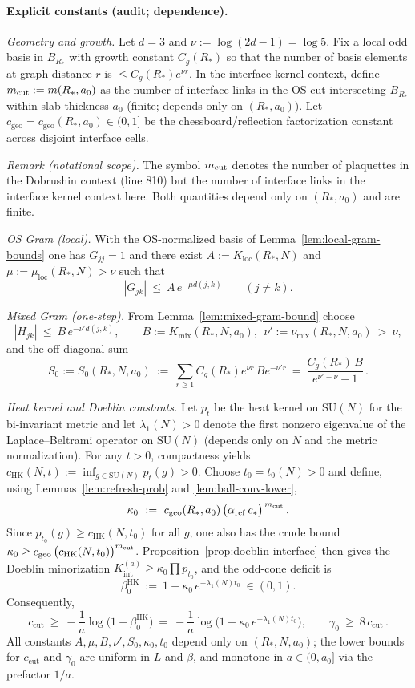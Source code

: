 \documentclass[11pt]{amsart}
\theoremstyle{plain}
\theoremstyle{definition}
\theoremstyle{remark}
\begin{document}
\paragraph{Explicit constants (audit; dependence).}
\emph{Geometry and growth.} Let $d=3$ and $\nu:=\log(2d-1)=\log 5$. Fix a local odd basis in $B_{R_*}$ with growth constant $C_g(R_*)$ so that the number of basis elements at graph distance $r$ is $\le C_g(R_*) e^{\nu r}$. In the interface kernel context, define $m_{\rm cut}:=m(R_*,a_0)$ as the number of interface links in the OS cut intersecting $B_{R_*}$ within slab thickness $a_0$ (finite; depends only on $(R_*,a_0)$). Let $c_{\mathrm{geo}}=c_{\mathrm{geo}}(R_*,a_0)\in(0,1]$ be the chessboard/reflection factorization constant across disjoint interface cells.

\emph{Remark (notational scope).} The symbol $m_{\rm cut}$ denotes the number of plaquettes in the Dobrushin context (line 810) but the number of interface links in the interface kernel context here. Both quantities depend only on $(R_*,a_0)$ and are finite.

\emph{OS Gram (local).} With the OS-normalized basis of Lemma~\ref{lem:local-gram-bounds} one has $G_{jj}=1$ and there exist $A:=K_{\mathrm{loc}}(R_*,N)$ and $\mu:=\mu_{\mathrm{loc}}(R_*,N)>\nu$ such that
\[
  |G_{jk}|\ \le\ A\,e^{-\mu d(j,k)}\qquad (j\ne k).
\]

\emph{Mixed Gram (one-step).} From Lemma~\ref{lem:mixed-gram-bound} choose
\[
  |H_{jk}|\ \le\ B\,e^{-\nu' d(j,k)},\qquad B:=K_{\mathrm{mix}}(R_*,N,a_0),\ \ \nu':=\nu_{\mathrm{mix}}(R_*,N,a_0)\ >\ \nu,
\]
and the off-diagonal sum
\[
  S_0:=S_0(R_*,N,a_0)\ :=\ \sum_{r\ge 1} C_g(R_*) e^{\nu r}\, B e^{-\nu' r}
   \ =\ \frac{C_g(R_*)\,B}{e^{\nu'-\nu}-1}\,.
\]

\emph{Heat kernel and Doeblin constants.} Let $p_t$ be the heat kernel on $\mathrm{SU}(N)$ for the bi-invariant metric and let $\lambda_1(N)>0$ denote the first nonzero eigenvalue of the Laplace--Beltrami operator on $\mathrm{SU}(N)$ (depends only on $N$ and the metric normalization). For any $t>0$, compactness yields $c_{\mathrm{HK}}(N,t):=\inf_{g\in \mathrm{SU}(N)} p_t(g)>0$. Choose $t_0=t_0(N)>0$ and define, using Lemmas~\ref{lem:refresh-prob} and \ref{lem:ball-conv-lower},
\[
  \kappa_0\ :=\ c_{\mathrm{geo}}(R_*,a_0)\,\bigl(\alpha_{\mathrm{ref}}\,c_*\bigr)^{\,m_{\rm cut}}\,.
\]
Since $p_{t_0}(g)\ge c_{\mathrm{HK}}(N,t_0)$ for all $g$, one also has the crude bound $\kappa_0\ge c_{\mathrm{geo}}\,\bigl(c_{\mathrm{HK}}(N,t_0)\bigr)^{m_{\rm cut}}$. Proposition~\ref{prop:doeblin-interface} then gives the Doeblin minorization $K_{\mathrm{int}}^{(a)}\ge \kappa_0 \prod p_{t_0}$, and the odd-cone deficit is
\[
  \beta_0^{\mathrm{HK}}\ :=\ 1-\kappa_0\,e^{-\lambda_1(N) t_0}\ \in (0,1).
\]
Consequently,
\[
  c_{\mathrm{cut}}\ \ge\ -\frac{1}{a}\log\bigl(1-\beta_0^{\mathrm{HK}}\bigr)
   \ =\ -\frac{1}{a}\log\bigl(1-\kappa_0\,e^{-\lambda_1(N) t_0}\bigr),
  \qquad \gamma_0\ \ge\ 8\,c_{\mathrm{cut}}\,.
\]
All constants $A,\mu,B,\nu',S_0,\kappa_0,t_0$ depend only on $(R_*,N,a_0)$; the lower bounds for $c_{\mathrm{cut}}$ and $\gamma_0$ are uniform in $L$ and $\beta$, and monotone in $a\in(0,a_0]$ via the prefactor $1/a$.
\end{document}
